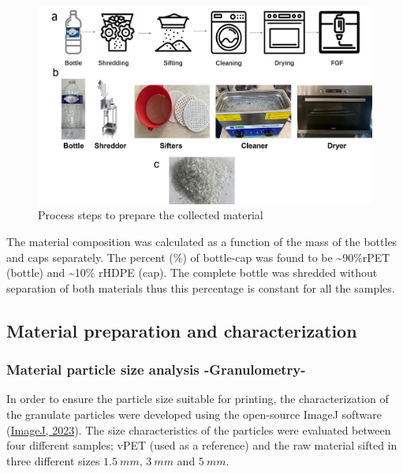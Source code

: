 \documentclass[
  12pt,
]{article}
\begin{document}
\begin{figure}

{\centering \includegraphics{figures/Fig_2.png}

}

\caption{\label{fig-fig1}Process steps to prepare the collected
material}

\end{figure}

The material composition was calculated as a function of the mass of the
bottles and caps separately. The percent (\%) of bottle-cap was found to
be \textasciitilde90\%rPET (bottle) and \textasciitilde10\% rHDPE (cap).
The complete bottle was shredded without separation of both materials
thus this percentage is constant for all the samples.

\hypertarget{material-preparation-and-characterization}{%
\subsection{Material preparation and
characterization}\label{material-preparation-and-characterization}}

\hypertarget{material-particle-size-analysis--granulometry-}{%
\subsubsection{Material particle size analysis
-Granulometry-}\label{material-particle-size-analysis--granulometry-}}

In order to ensure the particle size suitable for printing, the
characterization of the granulate particles were developed using the
open-source ImageJ software (\protect\hyperlink{ref-imagej2023}{ImageJ,
2023}). The size characteristics of the particles were evaluated between
four different samples; vPET (used as a reference) and the raw material
sifted in three different sizes \(1.5~mm\), \(3~mm\) and \(5~mm\).
\end{document}
